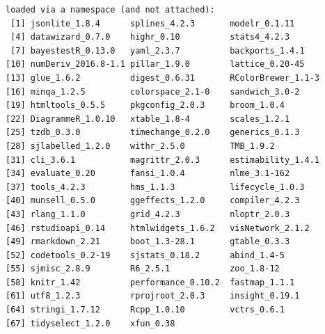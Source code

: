 \documentclass[
]{article}
\begin{document}
\begin{verbatim}
loaded via a namespace (and not attached):
 [1] jsonlite_1.8.4      splines_4.2.3       modelr_0.1.11      
 [4] datawizard_0.7.0    highr_0.10          stats4_4.2.3       
 [7] bayestestR_0.13.0   yaml_2.3.7          backports_1.4.1    
[10] numDeriv_2016.8-1.1 pillar_1.9.0        lattice_0.20-45    
[13] glue_1.6.2          digest_0.6.31       RColorBrewer_1.1-3 
[16] minqa_1.2.5         colorspace_2.1-0    sandwich_3.0-2     
[19] htmltools_0.5.5     pkgconfig_2.0.3     broom_1.0.4        
[22] DiagrammeR_1.0.10   xtable_1.8-4        scales_1.2.1       
[25] tzdb_0.3.0          timechange_0.2.0    generics_0.1.3     
[28] sjlabelled_1.2.0    withr_2.5.0         TMB_1.9.2          
[31] cli_3.6.1           magrittr_2.0.3      estimability_1.4.1 
[34] evaluate_0.20       fansi_1.0.4         nlme_3.1-162       
[37] tools_4.2.3         hms_1.1.3           lifecycle_1.0.3    
[40] munsell_0.5.0       ggeffects_1.2.0     compiler_4.2.3     
[43] rlang_1.1.0         grid_4.2.3          nloptr_2.0.3       
[46] rstudioapi_0.14     htmlwidgets_1.6.2   visNetwork_2.1.2   
[49] rmarkdown_2.21      boot_1.3-28.1       gtable_0.3.3       
[52] codetools_0.2-19    sjstats_0.18.2      abind_1.4-5        
[55] sjmisc_2.8.9        R6_2.5.1            zoo_1.8-12         
[58] knitr_1.42          performance_0.10.2  fastmap_1.1.1      
[61] utf8_1.2.3          rprojroot_2.0.3     insight_0.19.1     
[64] stringi_1.7.12      Rcpp_1.0.10         vctrs_0.6.1        
[67] tidyselect_1.2.0    xfun_0.38          
\end{verbatim}
\end{document}
